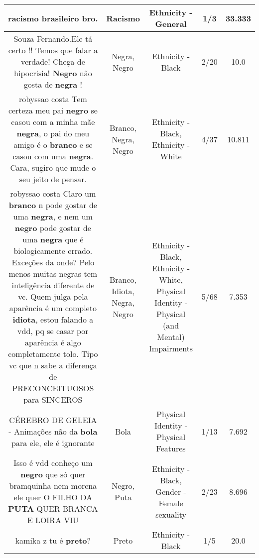 \documentclass[11pt]{article}
\newlength\mylength
\begin{document}
\begin{center}
\begin{longtable}{|C{.65\mylength}|C{.30\mylength}|C{.12\mylength}|C{.12\mylength}|C{.12\mylength}|}
  \small racismo brasileiro bro.\normalsize   & Racismo & Ethnicity - General & 1/3 & 33.333 \\  \hline
  \small Souza Fernando.Ele tá certo !! Temos que falar a verdade!  Chega de hipocrisia!  \textbf{Negro} não gosta de \textbf{negra}  !\normalsize   & Negra, Negro & Ethnicity - Black & 2/20 & 10.0 \\  \hline
  \small robyssao costa Tem certeza meu pai \textbf{negro} se casou com a minha mãe \textbf{negra}, o pai do meu amigo é o \textbf{branco} e se casou com uma \textbf{negra}. Cara, sugiro que mude o seu jeito de pensar.\normalsize   & Branco, Negra, Negro & Ethnicity - Black, Ethnicity - White & 4/37 & 10.811 \\  \hline
  \small robyssao costa Claro um \textbf{branco} n pode gostar de uma \textbf{negra}, e nem um \textbf{negro} pode gostar de uma \textbf{negra} que é biologicamente errado. Exceções da onde? Pelo menos muitas negras tem inteligência diferente de vc. Quem julga pela aparência é um completo \textbf{idiota}, estou falando a vdd, pq se casar por aparência é algo completamente tolo. Tipo vc que n sabe a diferença de PRECONCEITUOSOS para SINCEROS\normalsize   & Branco, Idiota, Negra, Negro & Ethnicity - Black, Ethnicity - White, Physical Identity - Physical (and Mental) Impairments & 5/68 & 7.353 \\  \hline
  \small CÉREBRO DE GELEIA - Animações não da \textbf{bola} para ele, ele é ignorante\normalsize   & Bola & Physical Identity - Physical Features & 1/13 & 7.692 \\  \hline
  \small Isso é vdd conheço um \textbf{negro} que só quer bramquinha nem morena ele quer O FILHO DA \textbf{PUTA} QUER BRANCA E LOIRA VIU\normalsize   & Negro, Puta & Ethnicity - Black, Gender - Female sexuality & 2/23 & 8.696 \\  \hline
  \small kamika z tu é \textbf{preto}?\normalsize   & Preto & Ethnicity - Black & 1/5 & 20.0 \\  \hline

\end{longtable}
\end{center}
\end{document}
